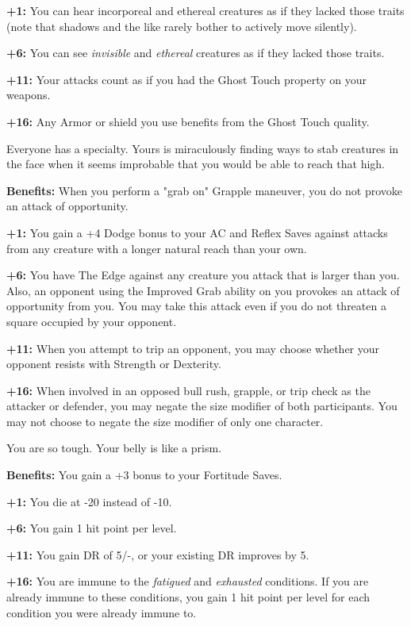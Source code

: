 \textbf{+1:} You can hear incorporeal and ethereal creatures as if they lacked those traits (note that shadows and the like rarely bother to actively move silently).

\textbf{+6:} You can see \textit{invisible} and \textit{ethereal} creatures as if they lacked those traits.

\textbf{+11:} Your attacks count as if you had the Ghost Touch property on your weapons.

\textbf{+16:} Any Armor or shield you use benefits from the Ghost Touch quality.


Everyone has a specialty. Yours is miraculously finding ways to stab creatures in the face when it seems improbable that you would be able to reach that high.

\textbf{Benefits:} When you perform a "grab on" Grapple maneuver, you do not provoke an attack of opportunity.

\textbf{+1:} You gain a +4 Dodge bonus to your AC and Reflex Saves against attacks from any creature with a longer natural reach than your own.

\textbf{+6:} You have The Edge against any creature you attack that is larger than you. Also, an opponent using the Improved Grab ability on you provokes an attack of opportunity from you. You may take this attack even if you do not threaten a square occupied by your opponent.

\textbf{+11:} When you attempt to trip an opponent, you may choose whether your opponent resists with Strength or Dexterity.

\textbf{+16:} When involved in an opposed bull rush, grapple, or trip check as the attacker or defender, you may negate the size modifier of both participants. You may not choose to negate the size modifier of only one character.


You are so tough. Your belly is like a prism.

\textbf{Benefits:} You gain a +3 bonus to your Fortitude Saves.

\textbf{+1:} You die at -20 instead of -10.

\textbf{+6:} You gain 1 hit point per level.

\textbf{+11:} You gain DR of 5/-, or your existing DR improves by 5.

\textbf{+16:} You are immune to the \textit{fatigued} and \textit{exhausted} conditions. If you are already immune to these conditions, you gain 1 hit point per level for each condition you were already immune to.

